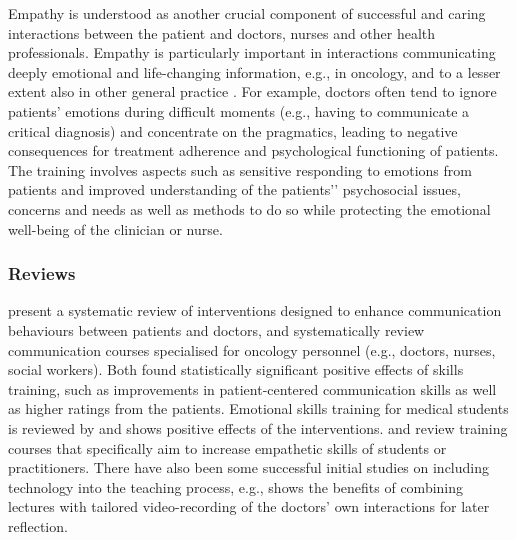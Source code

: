 \documentclass[prodmode,acmtochi]{acmsmall}
\newcommand{\todo}[1]{\textrm{\textrm{\textcolor{LightBlue}{[[#1]]}}}}
\newcommand{\GeraldineFIX}[1]{}
\begin{document}
Empathy is understood as another crucial component of successful and caring interactions between the patient and doctors, nurses and other health professionals. Empathy is particularly important in interactions communicating deeply emotional and life-changing information, e.g., in oncology, and to a lesser extent also in other general practice \cite{Barth2011}.
                For example, doctors often tend to ignore patients' emotions during difficult moments (e.g., having to communicate a critical diagnosis) and concentrate on the pragmatics, leading to negative consequences for treatment adherence and psychological functioning of patients. The training involves aspects such as sensitive responding to emotions from patients and improved understanding of the patients'’ psychosocial issues, concerns and needs as well as methods to do so while protecting the emotional well-being of the clinician or nurse. 


\GeraldineFIX{ G: say what technology how used in a sentence???}
\GeraldineFIX{ G: this doesn't seem to be empathy but about self awareness/regulation?  ... P: Is this a bit better? 
I'm drawing on the reviews and the concerns they use in this space -- in my reading it is also around objectification of the patient etc... where regulation is obviously important, but also as a part of being able to emphasise in these cases without burn-out etc. .. I think it might be too complex to go into details here (especially given what a tangled mess empathy as a concept is :)}

\subsubsection*{Reviews}  present a systematic review of interventions designed to enhance communication behaviours between patients and doctors, and  systematically review communication courses specialised for oncology personnel (e.g., doctors, nurses, social workers). Both  found statistically significant positive effects of skills training, such as improvements in patient-centered communication skills as well as higher ratings from the patients. Emotional skills training for medical students is reviewed by \cite{Satterfield2007} and shows positive effects of the interventions.  and  review training courses that specifically aim to increase empathetic skills of students or practitioners. There have also been some successful initial studies
on including technology into the teaching process, e.g., 
shows the benefits of combining lectures with tailored video-recording of
the doctors' own interactions for later reflection.
\end{document}
